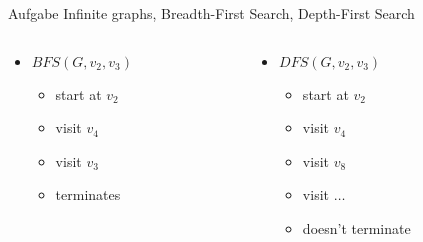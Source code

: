 \begin{frame}[allowframebreaks]{Aufgabe \thesection}{Infinite graphs, Breadth-First Search, Depth-First Search}
\begin{solutionnoinc}
\begin{columns}
\begin{column}[t]{0.5\textwidth}
\begin{itemize}
        \end{itemize}
        \begin{columns}
          \begin{column}[t]{0.5\linewidth}
            \begin{itemize}
              \item $BFS(G,v_2, v_3)$
              \begin{itemize}
                \item start at $v_2$
                \item visit $v_4$
                \item visit $v_3$
                \item terminates
              \end{itemize}
            \end{itemize}
          \end{column}
          \begin{column}[t]{0.5\linewidth}
            \begin{itemize}
              \item $DFS(G, v_2, v_3)$
              \begin{itemize}
                \item start at $v_2$
                \item visit $v_4$
                \item visit $v_8$
                \item visit $\ldots$
                \item doesn't terminate
              \end{itemize}
            \end{itemize}
          \end{column}
        \end{columns}
      \end{column}
    \end{columns}
  \end{solutionnoinc}
\end{frame}

